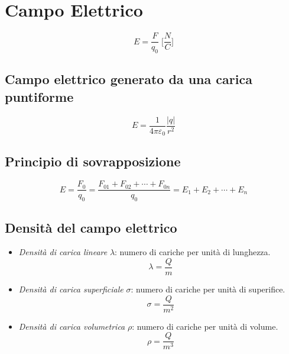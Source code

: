         \section*{Campo Elettrico}
            \begin{equation*}
                E = \frac{F}{q_0}\;\Bigg[\frac{N}{C}\Bigg]
            \end{equation*}

            \subsection{Campo elettrico generato da una carica puntiforme}
                \begin{equation}
                    E = \frac{1}{4\pi\varepsilon_0}\frac{|q|}{r^2}
                \end{equation}

            \subsection*{Principio di sovrapposizione} 
                \begin{equation*}
                    E = \frac{F_0}{q_0} = \frac{F_{01} + F_{02} + \cdots + 
                    F_{0n}}{q_0} = E_1 + E_2 + \cdots + E_n
                \end{equation*}

            \subsection*{Densità del campo elettrico} 
            \begin{itemize}
                \item \textit{Densità di carica lineare} $\lambda$: numero di 
                cariche per unità di lunghezza.\\
                    \begin{equation*}
                        \lambda = \frac{Q}{m}
                    \end{equation*}
                \item \textit{Densità di carica superficiale} $\sigma$: numero 
                di cariche per unità di superifice.\\
                    \begin{equation*}
                        \sigma = \frac{Q}{m^2}
                    \end{equation*}
                \item \textit{Densità di carica volumetrica} $\rho$: numero
                di cariche per unità di volume.\\
                    \begin{equation*}
                        \rho = \frac{Q}{m^3}
                    \end{equation*}
            \end{itemize}

